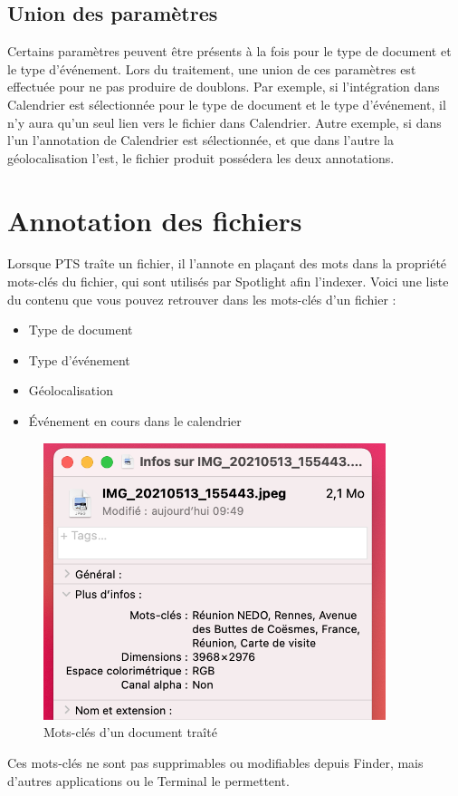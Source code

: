 \documentclass[a4paper,11pt]{article}
\begin{document}
	\subsection{Union des paramètres}
	Certains paramètres peuvent être présents à la fois pour le type de document et le type d'événement. Lors du traitement, une union de ces paramètres est effectuée pour ne pas produire de doublons. Par exemple, si l'intégration dans Calendrier est sélectionnée pour le type de document et le type d'événement, il n'y aura qu'un seul lien vers le fichier dans Calendrier. Autre exemple, si dans l'un l'annotation de Calendrier est sélectionnée, et que dans l'autre la géolocalisation l'est, le fichier produit possédera les deux annotations.
	
	
	\section{Annotation des fichiers}
	Lorsque PTS traîte un fichier, il l'annote en plaçant des mots dans la propriété mots-clés du fichier, qui sont utilisés par Spotlight afin l'indexer. Voici une liste du contenu que vous pouvez retrouver dans les mots-clés d'un fichier :
	\begin{itemize}
		\item Type de document
		\item Type d'événement
		\item Géolocalisation
		\item Événement en cours dans le calendrier
	\end{itemize}
	
	\begin{figure}[h!]
		\centering
		\includegraphics[width=10cm]{Mots-cles}
		\caption{Mots-clés d'un document traîté}
	\end{figure}
	
	Ces mots-clés ne sont pas supprimables ou modifiables depuis Finder, mais d'autres applications ou le Terminal le permettent.
	
\end{document}
